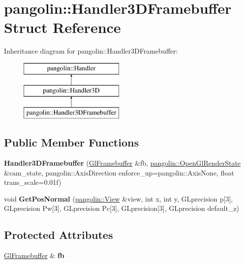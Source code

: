\hypertarget{structpangolin_1_1_handler3_d_framebuffer}{}\section{pangolin\+:\+:Handler3\+D\+Framebuffer Struct Reference}
\label{structpangolin_1_1_handler3_d_framebuffer}
Inheritance diagram for pangolin\+:\+:Handler3\+D\+Framebuffer\+:\begin{figure}[H]
\begin{center}
\leavevmode
\includegraphics[height=3.000000cm]{structpangolin_1_1_handler3_d_framebuffer}
\end{center}
\end{figure}
\subsection*{Public Member Functions}
\begin{DoxyCompactItemize}
\item 
{\bfseries Handler3\+D\+Framebuffer} (\hyperlink{structpangolin_1_1_gl_framebuffer}{Gl\+Framebuffer} \&fb, \hyperlink{classpangolin_1_1_open_gl_render_state}{pangolin\+::\+Open\+Gl\+Render\+State} \&cam\+\_\+state, pangolin\+::\+Axis\+Direction enforce\+\_\+up=pangolin\+::\+Axis\+None, float trans\+\_\+scale=0.\+01f)\hypertarget{structpangolin_1_1_handler3_d_framebuffer_a2b9665b147e791132a5c7e569ad8c4e3}{}\label{structpangolin_1_1_handler3_d_framebuffer_a2b9665b147e791132a5c7e569ad8c4e3}

\item 
void {\bfseries Get\+Pos\+Normal} (\hyperlink{structpangolin_1_1_view}{pangolin\+::\+View} \&view, int x, int y, G\+Lprecision p\mbox{[}3\mbox{]}, G\+Lprecision Pw\mbox{[}3\mbox{]}, G\+Lprecision Pc\mbox{[}3\mbox{]}, G\+Lprecision\mbox{[}3\mbox{]}, G\+Lprecision default\+\_\+z)\hypertarget{structpangolin_1_1_handler3_d_framebuffer_a2247464e9429db0d7a6661cb0e43da34}{}\label{structpangolin_1_1_handler3_d_framebuffer_a2247464e9429db0d7a6661cb0e43da34}

\end{DoxyCompactItemize}
\subsection*{Protected Attributes}
\begin{DoxyCompactItemize}
\item 
\hyperlink{structpangolin_1_1_gl_framebuffer}{Gl\+Framebuffer} \& {\bfseries fb}\hypertarget{structpangolin_1_1_handler3_d_framebuffer_ab24fefc81aa545e8493b9978ae7d26d1}{}\label{structpangolin_1_1_handler3_d_framebuffer_ab24fefc81aa545e8493b9978ae7d26d1}

\end{DoxyCompactItemize}
